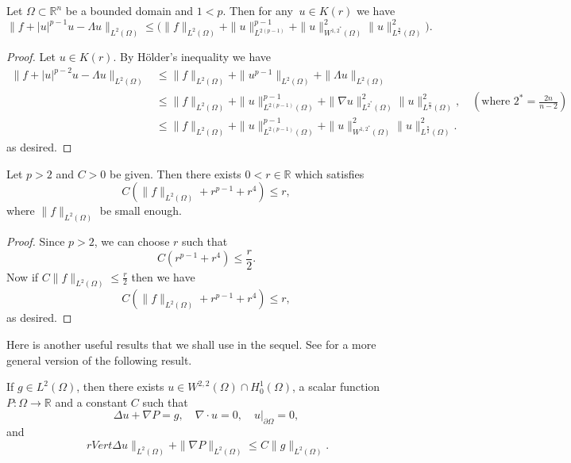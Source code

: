 \documentclass[reqno]{amsart}
\begin{document}
\begin{lemma}\label{C1C2}
 Let \(\Omega \subset \mathbb{R}^n \) be a bounded domain and \( 1<p\).
Then for any $\ u\in K(r) $ we have
\[
\big\rVert f+|u|^{p-1}u-\Lambda u\big\rVert_{L^2(\Omega)}
\leq \big( \rVert f\rVert_{L^2(\Omega)}
+\rVert u\rVert^{p-1}_{L^{2(p-1)}}+\rVert {u}\rVert^{2}_{W^{1,2^*}(\Omega)}
\rVert  {u}\rVert^2_{L^{\frac{n}{2}}(\Omega)} \big).
\]
\end{lemma}

\begin{proof}
Let \(u \in K(r)\). By H\"older's inequality we have
\begin{align*}
     \big\rVert f+|u|^{p-2}u-\Lambda u\big\rVert_{L^2(\Omega)}
     &\leq \rVert f\rVert_{L^2(\Omega)}+\rVert u^{p-1}\rVert_{L^2(\Omega)}
     +\rVert \Lambda u\rVert_{L^2(\Omega)}\\
     &\leq \rVert f\rVert_{L^2(\Omega)}+\rVert u\rVert^{p-1}_{L^{2(p-1)}(\Omega)}
     +\rVert \nabla u\rVert^2_{L^{2^*}(\Omega)}
     \rVert  u\rVert^2_{L^{\frac{n}{2}}(\Omega)}, \quad (\text{where }2^*=\frac{2n}{n-2})\\
     &\leq \rVert f\rVert_{L^2(\Omega)}+\rVert u\rVert^{p-1}_{L^{2(p-1)}(\Omega)}
     +\rVert  u\rVert^2_{W^{1,2^*}(\Omega)}\rVert  u\rVert^2_{L^{\frac{n}{2}}(\Omega)}.
\end{align*}
as desired.
\end{proof}

\begin{lemma}\label{rbar}
Let \( p>2 \) and \(C>0\) be given. Then there exists \(0<{r}\in \mathbb{R}\) which satisfies
 \[ C (\rVert f\rVert_{L^2(\Omega)} +{r}^{p-1}+{r}^4)\leq {r},\]
 where \(\rVert f\rVert_{L^2(\Omega)}\) be small enough.
\end{lemma}

\begin{proof} Since \(p >2\), we can choose \({r}\) such that
\[
C( {r}^{p-1}+ {r}^4)\leq \frac{{r}}{2}.
\]
Now if \(C\rVert f\rVert_{L^2(\Omega)}\leq \frac{{r}}{2}\) then we have
\[
C (\rVert f\rVert_{L^2(\Omega)} +{r}^{p-1}+{r}^4)\leq {r},
\]
as desired.
\end{proof}

Here is another useful results that we shall use in the sequel.
See \cite[Theorem 1.2]{RH} for a more general version of the following result.

\begin{lemma}\label{nabla lem}
If \(g\in L^2(\Omega)\), then there exists  \(u \in W^{2,2}(\Omega)\cap H_0^1(\Omega)\),
a scalar function \(P : \Omega \to\mathbb{R}\)  and a constant \( C\) such that
 \[
\Delta u + \nabla P = g, \quad  \nabla\cdot u=0,\quad  u|_{\partial \Omega}=0,
\]
and
\[\
rVert \Delta u \rVert_{L^2(\Omega)}+\rVert \nabla P \rVert_{L^2(\Omega)}
\leq C\rVert g \rVert_{L^2(\Omega)}.
\]
\end{lemma}
\end{document}
